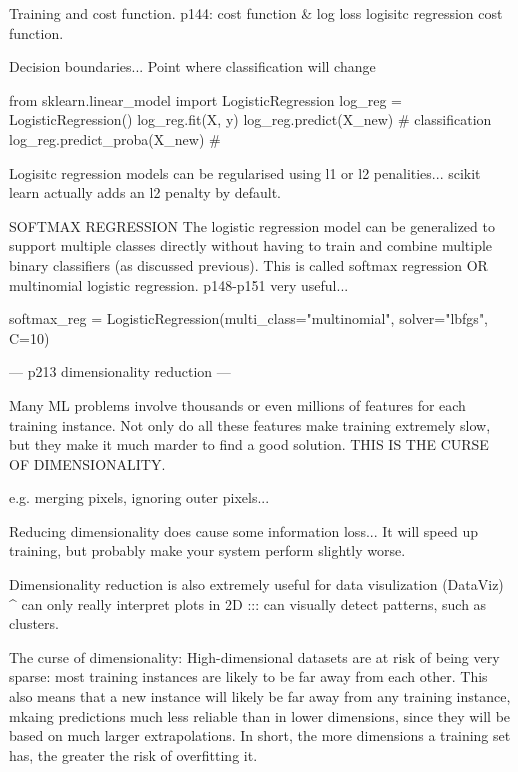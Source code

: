 Training and cost function.
p144: cost function & log loss logisitc regression cost function.

Decision boundaries...
Point where classification will change

from sklearn.linear_model import LogisticRegression
log_reg = LogisticRegression()
log_reg.fit(X, y)
log_reg.predict(X_new) # classification
log_reg.predict_proba(X_new) # 

Logisitc regression models can be regularised using l1 or l2 penalities...
scikit learn actually adds an l2 penalty by default.

SOFTMAX REGRESSION
The logistic regression model can be generalized to support multiple classes directly
without having to train and combine multiple binary classifiers (as discussed previous).
This is called softmax regression OR multinomial logistic regression.
p148-p151 very useful...

softmax_reg = LogisticRegression(multi_class="multinomial", solver="lbfgs", C=10)




















---
p213 dimensionality reduction
---

Many ML problems involve thousands or even millions of features for each training instance.
Not only do all these features make training extremely slow,
but they make it much marder to find a good solution.
THIS IS THE CURSE OF DIMENSIONALITY.

e.g. merging pixels, ignoring outer pixels...

Reducing dimensionality does cause some information loss...
It will speed up training, but probably make your system perform slightly worse.

Dimensionality reduction is also extremely useful for data visulization (DataViz)
^ can only really interpret plots in 2D ::: can visually detect patterns, such as clusters.


The curse of dimensionality:
High-dimensional datasets are at risk of being very sparse:
most training instances are likely to be far away from each other.
This also means that a new instance will likely be far away from any training instance,
mkaing predictions much less reliable than in lower dimensions,
since they will be based on much larger extrapolations.
In short, the more dimensions a training set has,
the greater the risk of overfitting it.

